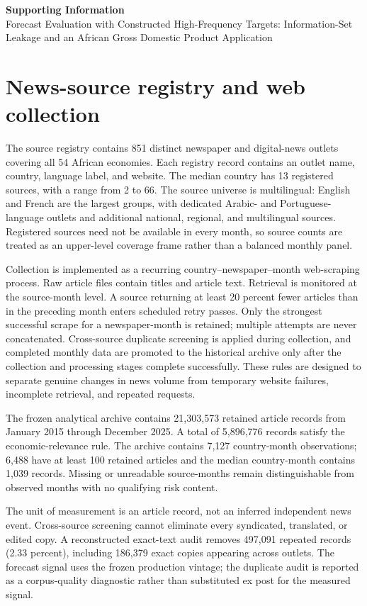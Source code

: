 \documentclass[12pt]{article}
\begin{document}
\begin{center}
{\Large \textbf{Supporting Information}}\\[0.5em]
{\large Forecast Evaluation with Constructed High-Frequency Targets: Information-Set Leakage and an African Gross Domestic Product Application}
\end{center}

\section{News-source registry and web collection}
The source registry contains 851 distinct newspaper and digital-news outlets covering all 54 African economies. Each registry record contains an outlet name, country, language label, and website. The median country has 13 registered sources, with a range from 2 to 66. The source universe is multilingual: English and French are the largest groups, with dedicated Arabic- and Portuguese-language outlets and additional national, regional, and multilingual sources. Registered sources need not be available in every month, so source counts are treated as an upper-level coverage frame rather than a balanced monthly panel.

Collection is implemented as a recurring country--newspaper--month web-scraping process. Raw article files contain titles and article text. Retrieval is monitored at the source-month level. A source returning at least 20 percent fewer articles than in the preceding month enters scheduled retry passes. Only the strongest successful scrape for a newspaper-month is retained; multiple attempts are never concatenated. Cross-source duplicate screening is applied during collection, and completed monthly data are promoted to the historical archive only after the collection and processing stages complete successfully. These rules are designed to separate genuine changes in news volume from temporary website failures, incomplete retrieval, and repeated requests.

The frozen analytical archive contains 21,303,573 retained article records from January 2015 through December 2025. A total of 5,896,776 records satisfy the economic-relevance rule. The archive contains 7,127 country-month observations; 6,488 have at least 100 retained articles and the median country-month contains 1,039 records. Missing or unreadable source-months remain distinguishable from observed months with no qualifying risk content.

The unit of measurement is an article record, not an inferred independent news event. Cross-source screening cannot eliminate every syndicated, translated, or edited copy. A reconstructed exact-text audit removes 497,091 repeated records (2.33 percent), including 186,379 exact copies appearing across outlets. The forecast signal uses the frozen production vintage; the duplicate audit is reported as a corpus-quality diagnostic rather than substituted ex post for the measured signal.
\end{document}
